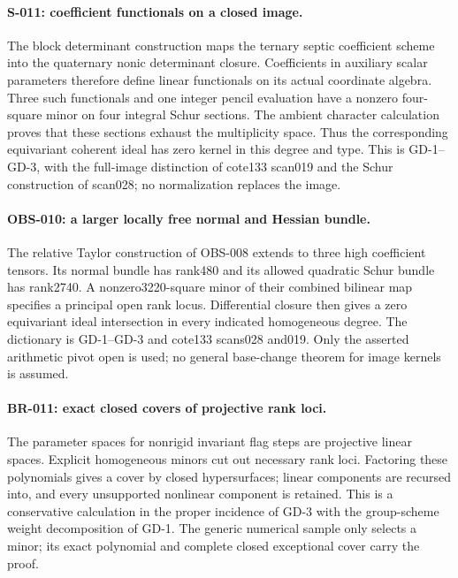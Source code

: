 \paragraph{S-011: coefficient functionals on a closed image.}
The block determinant construction maps the ternary septic coefficient
scheme into the quaternary nonic determinant closure. Coefficients in
auxiliary scalar parameters therefore define linear functionals on its
actual coordinate algebra. Three such functionals and one integer pencil
evaluation have a nonzero four-square minor on four integral Schur
sections. The ambient character calculation proves that these sections
exhaust the multiplicity space. Thus the corresponding equivariant
coherent ideal has zero kernel in this degree and type. This is
GD-1--GD-3, with the full-image distinction of cote133 scan019 and
the Schur construction of scan028; no normalization replaces the image.

\paragraph{OBS-010: a larger locally free normal and Hessian bundle.}
The relative Taylor construction of OBS-008 extends to three high
coefficient tensors. Its normal bundle has rank480 and its allowed
quadratic Schur bundle has rank2740. A nonzero3220-square minor of
their combined bilinear map specifies a principal open rank locus.
Differential closure then gives a zero equivariant ideal intersection
in every indicated homogeneous degree. The dictionary is GD-1--GD-3
and cote133 scans028 and019. Only the asserted arithmetic pivot open
is used; no general base-change theorem for image kernels is assumed.

\paragraph{BR-011: exact closed covers of projective rank loci.}
The parameter spaces for nonrigid invariant flag steps are projective
linear spaces. Explicit homogeneous minors cut out necessary rank loci.
Factoring these polynomials gives a cover by closed hypersurfaces;
linear components are recursed into, and every unsupported nonlinear
component is retained. This is a conservative calculation in the
proper incidence of GD-3 with the group-scheme weight decomposition
of GD-1. The generic numerical sample only selects a minor; its exact
polynomial and complete closed exceptional cover carry the proof.

